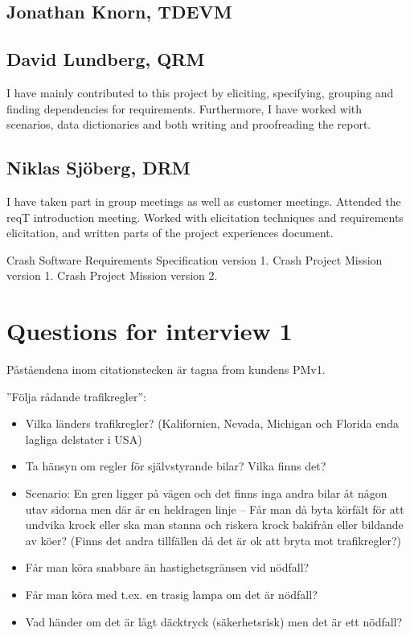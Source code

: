 \documentclass[10pt]{article}
\begin{document}
\subsection{Jonathan Knorn, TDEVM}

\subsection{David Lundberg, QRM}
I have mainly contributed to this project by eliciting, specifying, grouping and finding dependencies for requirements. Furthermore, I have worked with scenarios, data dictionaries and both writing and proofreading the report.
\subsection{Niklas Sjöberg, DRM}
I have taken part in group meetings as well as customer meetings. Attended the reqT introduction meeting. Worked with elicitation techniques and requirements elicitation, and written parts of the project experiences document. 

\newpage
\begin{thebibliography}{1}
 Crash Software Requirements Specification version 1. 
 Crash Project Mission version 1.
 Crash Project Mission version 2.
\end{thebibliography}
\newpage

\appendix
\section{Questions for interview 1}
Påståendena inom citationstecken är tagna from kundens PMv1.

\noindent”Följa rådande trafikregler”:
\begin{itemize}
\item Vilka länders trafikregler? (Kalifornien, Nevada, Michigan och Florida enda lagliga delstater i USA)
\item Ta hänsyn om regler för självstyrande bilar? Vilka finns det?
\item Scenario: En gren ligger på vägen och det finns inga andra bilar åt någon utav sidorna men där är en heldragen linje – Får man då byta körfält för att undvika krock eller ska man stanna och riskera krock bakifrån eller bildande av köer? (Finns det andra tillfällen då det är ok att bryta mot trafikregler?)
\item Får man köra snabbare än hastighetsgränsen vid nödfall?
\item Får man köra med t.ex. en trasig lampa om det är nödfall?
\item Vad händer om det är lågt däcktryck (säkerhetsrisk) men det är ett nödfall?
\end{itemize}
\hfill \break
\end{document}
